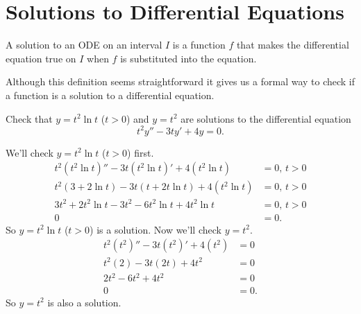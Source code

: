 \section{Solutions to Differential Equations}
\begin{definition}
	A solution to an ODE on an interval $I$ is a function $f$ that makes the differential equation true on $I$ when $f$ is substituted into the equation.
\end{definition}
\noindent
Although this definition seems straightforward it gives us a formal way to check if a function is a solution to a differential equation.

\begin{example}
	Check that $y = t^2\ln{t}$ ($t > 0$) and $y = t^2$  are solutions to the differential equation
	\begin{equation*}
		t^2y'' - 3ty' + 4y = 0.
	\end{equation*}
\end{example}
\noindent
We'll check $y= t^2\ln{t}$ ($t > 0$) first.
\begin{align*}
	t^2\left(t^2\ln{t}\right)'' - 3t\left(t^2\ln{t}\right)' + 4\left(t^2\ln{t}\right) &= 0 \text{, } t > 0 \\
	t^2\left(3 + 2\ln{t}\right) - 3t\left(t + 2t\ln{t}\right) + 4\left(t^2\ln{t}\right) &= 0 \text{, } t > 0 \\
	3t^2 + 2t^2\ln{t} - 3t^2 - 6t^2\ln{t} + 4t^2\ln{t} &= 0 \text{, } t > 0 \\
	0 &= 0.
\end{align*}
So $y = t^2\ln{t}$ ($t > 0$) is a solution.
Now we'll check $y= t^2$.
\begin{align*}
	t^2\left(t^2\right)'' - 3t\left(t^2\right)' + 4\left(t^2\right) &= 0 \\
	t^2\left(2\right) - 3t\left(2t\right) + 4t^2 &= 0 \\
	2t^2 - 6t^2 + 4t^2 &= 0 \\
	0 &= 0.
\end{align*}
So $y = t^2$ is also a solution.